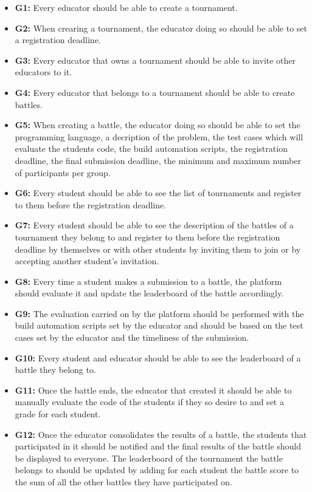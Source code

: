 \documentclass{article}
\begin{document}
\begin{itemize}
    \item \textbf{G1:} Every educator should be able to create a tournament.
    \item \textbf{G2:} When crearing a tournament, the educator doing so should be able to set a registration deadline.
    \item \textbf{G3:} Every educator that owns a tournament should be able to invite other educators to it.
    \item \textbf{G4:} Every educator that belongs to a tournament should be able to create battles.
    \item \textbf{G5:} When creating a battle, the educator doing so should be able to set the programming language, a decription of the problem, the test cases which will evaluate the students code, the build automation scripts, the registration deadline, the final submission deadline, the minimum and maximum number of participants per group.
    \item \textbf{G6:} Every student should be able to see the list of tournaments and register to them before the registration deadline.
    \item \textbf{G7:} Every student should be able to see the description of the battles of a tournament they belong to and register to them before the registration deadline by themselves or with other students by inviting them to join or by accepting another student's invitation.
    \item \textbf{G8:} Every time a student makes a submission to a battle, the platform should evaluate it and update the leaderboard of the battle accordingly.
    \item \textbf{G9:} The evaluation carried on by the platform should be performed with the build automation scripts set by the educator and should be based on the test cases set by the educator and the timeliness of the submission.
    \item \textbf{G10:} Every student and educator should be able to see the leaderboard of a battle they belong to.
    \item \textbf{G11:} Once the battle ends, the educator that created it should be able to manually evaluate the code of the students if they so desire to and set a grade for each student.
    \item \textbf{G12:} Once the educator consolidates the results of a battle, the students that participated in it should be notified and the final results of the battle should be displayed to everyone. The leaderboard of the tournament the battle belongs to should be updated by adding for each student the battle score to the sum of all the other battles they have participated on.

\end{itemize}
\end{document}
